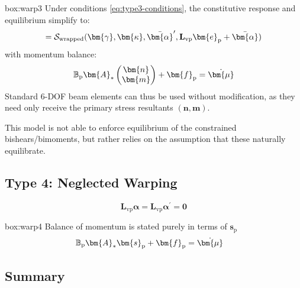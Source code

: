 \vspace{1ex}
\begin{ambox}{box:warp3}
Under conditions \eqref{eq:type3-conditions}, the constitutive response and equilibrium simplify to:
\begin{equation*}
[\bm{n}, \bm{m}] = \mathcal{S}_{\rm wrapped}(\bm{\gamma}, \bm{\kappa}, \bar{\bm{\alpha}}', \mathbf{L}_{\rm vp}\bm{e}_{\rm p} + \bar{\bm{\alpha}})
\end{equation*}
with momentum balance:
\begin{equation}
\mathbb{B}_{\rm p} \bm{A}_* \begin{pmatrix} \bm{n} \\ \bm{m} \end{pmatrix} + \bm{f}_{\mathrm{p}} = \dot{\bm{\mu}}
\end{equation}
Standard 6-DOF beam elements can thus be used without modification, as they need only receive the primary stress resultants $(\bm{n}, \bm{m})$.
\end{ambox}

 This model is not able to enforce equilibrium of the constrained bishears/bimoments, but rather relies on the assumption that these naturally equilibrate. 


\subsection{Type 4: Neglected Warping}
\[
\mathbf{L}_{\mathrm{vp}} \bm{\alpha} =\mathbf{L}_{\mathrm{vp}} \bm{\alpha}^{\prime}=\mathbf{0}
\]
\begin{ambox}{box:warp4}
Balance of momentum is stated purely in terms of \(\bm{s}_{\mathrm{p}}\)
\begin{equation}
\begin{aligned}
    \mathbb{B}_{\rm p} \bm{A}_* \bm{s}_{\mathrm{p}}+ \bm{f}_{\mathrm{p}} &= \dot{\bm{\mu}}
\end{aligned}
\end{equation}
\end{ambox}


\subsection{Summary}

